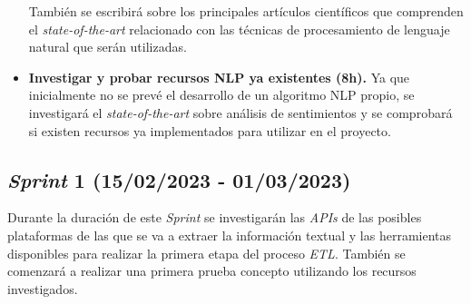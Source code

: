\begin{itemize}
    También se escribirá sobre los principales artículos científicos que comprenden el \textit{state-of-the-art} relacionado con las técnicas de procesamiento de lenguaje natural que serán utilizadas.

    \item \textbf{Investigar y probar recursos NLP ya existentes (8h).} Ya que inicialmente no se prevé el desarrollo de un algoritmo NLP propio, se investigará el \textit{state-of-the-art} sobre análisis de sentimientos y se comprobará si existen recursos ya implementados para utilizar en el proyecto.

\end{itemize}


\subsection{\textit{Sprint} 1 (15/02/2023 - 01/03/2023)}

Durante la duración de este \textit{Sprint} se investigarán las \textit{APIs} de las posibles plataformas de las que se va a extraer la información textual y las herramientas disponibles para realizar la primera etapa del proceso \textit{ETL}. También se comenzará a realizar una primera prueba concepto utilizando los recursos investigados.

